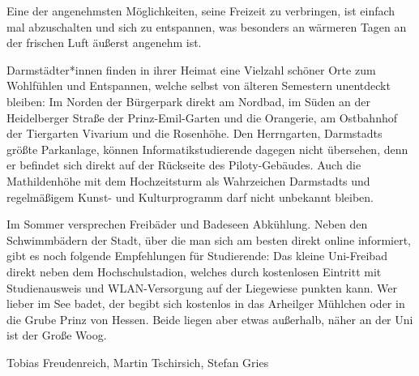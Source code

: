 {Eine der angenehmsten Möglichkeiten, seine Freizeit zu verbringen, ist einfach mal abzuschalten und sich zu entspannen, was besonders an wärmeren Tagen an der frischen Luft äußerst angenehm ist.
}{
    Darmstädter*innen finden in ihrer Heimat eine Vielzahl schöner Orte zum Wohlfühlen und Entspannen, welche selbst von älteren Semestern unentdeckt bleiben: Im Norden der Bürgerpark direkt am Nordbad, im Süden an der Heidelberger Straße der Prinz-Emil-Garten und die Orangerie, am Ostbahnhof der Tiergarten Vivarium und die Rosenhöhe.
    Den Herrngarten, Darmstadts größte Parkanlage, können Informatikstudierende dagegen nicht übersehen, denn er befindet sich direkt auf der Rückseite des Piloty-Gebäudes. Auch die Mathildenhöhe mit dem Hochzeitsturm als Wahrzeichen Darmstadts und regelmäßigem Kunst- und Kulturprogramm darf nicht unbekannt bleiben.

    Im Sommer versprechen Freibäder und Badeseen Abkühlung. Neben den Schwimmbädern der Stadt, über die man sich am besten direkt online informiert, gibt es noch folgende Empfehlungen für Studierende: Das kleine Uni-Freibad direkt neben dem Hochschulstadion, welches durch kostenlosen Eintritt mit Studienausweis und WLAN-Versorgung auf der Liegewiese punkten kann.
    Wer lieber im See badet, der begibt sich kostenlos in das Arheilger Mühlchen oder in die Grube Prinz von Hessen. Beide liegen aber etwas außerhalb, näher an der Uni ist der Große Woog.
}
{Tobias Freudenreich, Martin Tschirsich, Stefan Gries}
\newpage
